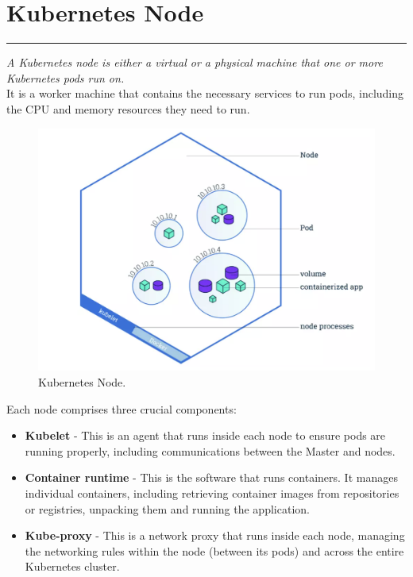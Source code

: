 \documentclass{article}
\begin{document}
\section{Kubernetes Node}
\noindent
{\color{red} \rule{\linewidth}{0.5mm}}
\begin{tcolorbox}[colback=red!5!white, colframe=red!50!black,title=What is a Kubernetes Node?]
   \textit{A Kubernetes node is either a virtual or a physical machine that one or more Kubernetes pods run on.} \\
It is a worker machine that contains the necessary services to run pods, including the CPU and memory resources they need to run.\\
\end{tcolorbox}
\begin{figure}
\centering
\includegraphics[width=0.85\linewidth]{k8sDiagrams/KubernetesNode.png}
\caption{\label{fig:k8sNode}Kubernetes Node.}
\end{figure} 
Each node comprises three crucial components:
\begin{itemize}
    \item \textbf{Kubelet} - This is an agent that runs inside each node to ensure pods are running properly, including communications between the Master and nodes.
    \item \textbf{Container runtime} - This is the software that runs containers. It manages individual containers, including retrieving container images from repositories or registries, unpacking them and running the application.
    \item \textbf{Kube-proxy} - This is a network proxy that runs inside each node, managing the networking rules within the node (between its pods) and across the entire Kubernetes cluster.
\end{itemize}
\end{document}
